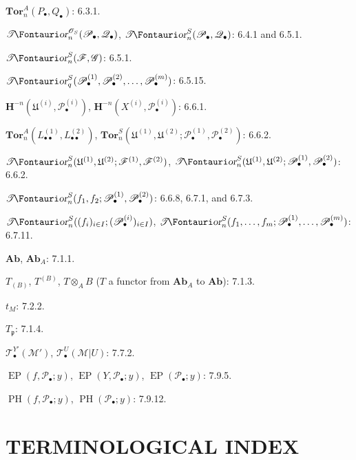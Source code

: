 \documentclass[10pt,oneside]{book}
\newcommand{\sh}[1]{\mathscr{#1}}
\newcommand{\shTor}{\sh{T}\textup{\kern-2.2pt{\Fontauri\slshape or}}}
\newcommand{\oldpage}[2][]{\setcounter{footnote}{0}\marginpar{\scriptsize\textbf{#1}~|~#2}\ignorespaces}
\begin{document}
\begin{flushleft}
$\mathbf{Tor}_n^A(P_\bullet,Q_\bullet)$: 6.3.1.

\medskip
$\shTor_n^{\sh{O}_S}(\sh{P}_\bullet,\sh{Q}_\bullet)$,
$\shTor_n^S(\sh{P}_\bullet,\sh{Q}_\bullet)$: 6.4.1 and 6.5.1.

\medskip
$\shTor_n^S(\sh{F},\sh{G})$: 6.5.1.

\medskip
$\shTor_q^S(\sh{P}_\bullet^{(1)},\sh{P}_\bullet^{(2)},\ldots,
\sh{P}_\bullet^{(m)})$: 6.5.15.

\medskip
$\mathbf H^{-n}(\mathfrak U^{(i)},\sh{P}_\bullet^{(i)})$,
$\mathbf H^{-n}(X^{(i)},\sh{P}_\bullet^{(i)})$: 6.6.1.

\medskip
$\mathbf{Tor}_n^A(L_{\bullet\bullet}^{(1)},L_{\bullet\bullet}^{(2)})$,
$\mathbf{Tor}_n^S(\mathfrak U^{(1)},\mathfrak U^{(2)};
\sh{P}_\bullet^{(1)},\sh{P}_\bullet^{(2)})$: 6.6.2.

\medskip
$\shTor_n^S(\mathfrak U^{(1)},\mathfrak U^{(2)};
\sh{F}^{(1)},\sh{F}^{(2)})$,
$\shTor_n^S(\mathfrak U^{(1)},\mathfrak U^{(2)};
\sh{P}_\bullet^{(1)},\sh{P}_\bullet^{(2)})$: 6.6.2.

\medskip
$\shTor_n^S(f_1,f_2;\sh{P}_\bullet^{(1)},
\sh{P}_\bullet^{(2)})$: 6.6.8, 6.7.1, and 6.7.3.

\medskip
$\shTor_n^S((f_i)_{i\in I};(\sh{P}_\bullet^{(i)})_{i\in I})$,
$\shTor_n^S(f_1,\ldots,f_m;\sh{P}_\bullet^{(1)},\ldots,
\sh{P}_\bullet^{(m)})$: 6.7.11.

\medskip
$\mathbf{Ab}$, $\mathbf{Ab}_A$: 7.1.1.

\medskip
$T_{(B)}$, $T^{(B)}$, $T\otimes_A B$
($T$ a functor from $\mathbf{Ab}_A$ to $\mathbf{Ab}$): 7.1.3.

\medskip
$t_M$: 7.2.2.

\medskip
$T_{\mathfrak p}$: 7.1.4.

\medskip
$\sh{T}_\bullet^{Y'}(\sh{M}')$,
$\sh{T}_\bullet^U(\sh{M}|U)$: 7.7.2.

\medskip
$\operatorname{EP}(f,\sh{P}_\bullet;y)$,
$\operatorname{EP}(Y,\sh{P}_\bullet;y)$,
$\operatorname{EP}(\sh{P}_\bullet;y)$: 7.9.5.

\medskip
$\operatorname{PH}(f,\sh{P}_\bullet;y)$,
$\operatorname{PH}(\sh{P}_\bullet;y)$: 7.9.12.
\end{flushleft}

\clearpage
\oldpage[III]{214}
\section*{TERMINOLOGICAL INDEX}
\end{document}
